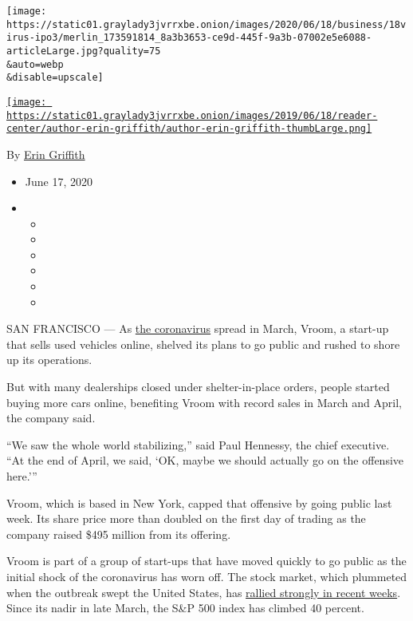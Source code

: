 \texttt{[image: https://static01.graylady3jvrrxbe.onion/images/2020/06/18/business/18virus-ipo3/merlin\_173591814\_8a3b3653-ce9d-445f-9a3b-07002e5e6088-articleLarge.jpg?quality=75\\\&auto=webp\\\&disable=upscale]}

\href{https://www.nytimes3xbfgragh.onion/by/erin-griffith}{\texttt{[image: https://static01.graylady3jvrrxbe.onion/images/2019/06/18/reader-center/author-erin-griffith/author-erin-griffith-thumbLarge.png]}}

By \href{https://www.nytimes3xbfgragh.onion/by/erin-griffith}{Erin
Griffith}

\begin{itemize}
\item
  June 17, 2020
\item
  \begin{itemize}
  \item
  \item
  \item
  \item
  \item
  \item
  \end{itemize}
\end{itemize}

SAN FRANCISCO --- As
\href{https://www.nytimes3xbfgragh.onion/news-event/coronavirus?action=click\&pgtype=Article\&state=default\&module=styln-coronavirus\&variant=show\&region=TOP_BANNER\&context=storylines_menu}{the
coronavirus} spread in March, Vroom, a start-up that sells used vehicles
online, shelved its plans to go public and rushed to shore up its
operations.

But with many dealerships closed under shelter-in-place orders, people
started buying more cars online, benefiting Vroom with record sales in
March and April, the company said.

``We saw the whole world stabilizing,'' said Paul Hennessy, the chief
executive. ``At the end of April, we said, `OK, maybe we should actually
go on the offensive here.'''

Vroom, which is based in New York, capped that offensive by going public
last week. Its share price more than doubled on the first day of trading
as the company raised \$495 million from its offering.

Vroom is part of a group of start-ups that have moved quickly to go
public as the initial shock of the coronavirus has worn off. The stock
market, which plummeted when the outbreak swept the United States, has
\href{https://www.nytimes3xbfgragh.onion/2020/06/08/business/recession-stock-market-coronavirus.html}{rallied
strongly in recent weeks}. Since its nadir in late March, the S\&P 500
index has climbed 40 percent.

